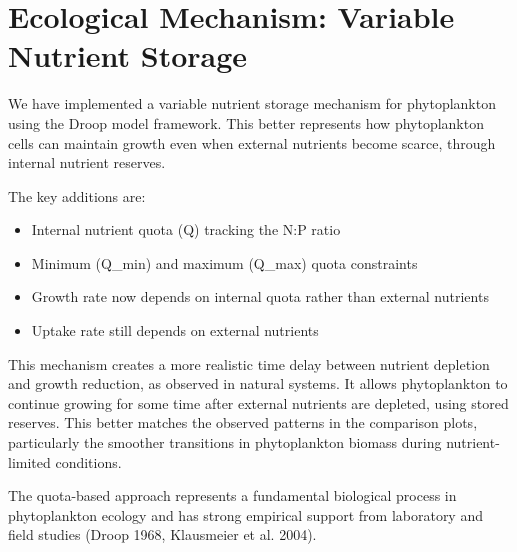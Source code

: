 \section{Ecological Mechanism: Variable Nutrient Storage}

We have implemented a variable nutrient storage mechanism for phytoplankton using the Droop model framework. This better represents how phytoplankton cells can maintain growth even when external nutrients become scarce, through internal nutrient reserves.

The key additions are:
\begin{itemize}
    \item Internal nutrient quota (Q) tracking the N:P ratio
    \item Minimum (Q\_min) and maximum (Q\_max) quota constraints
    \item Growth rate now depends on internal quota rather than external nutrients
    \item Uptake rate still depends on external nutrients
\end{itemize}

This mechanism creates a more realistic time delay between nutrient depletion and growth reduction, as observed in natural systems. It allows phytoplankton to continue growing for some time after external nutrients are depleted, using stored reserves. This better matches the observed patterns in the comparison plots, particularly the smoother transitions in phytoplankton biomass during nutrient-limited conditions.

The quota-based approach represents a fundamental biological process in phytoplankton ecology and has strong empirical support from laboratory and field studies (Droop 1968, Klausmeier et al. 2004).
